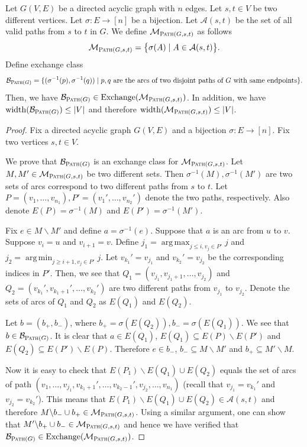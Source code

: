 \documentclass{article}
\newcommand{\M}{\mathcal M}
\newcommand{\B}{\mathcal B}
\newcommand{\del}{\backslash}
\DeclareMathOperator{\rank}{width}
\DeclareMathOperator*{\argmax}{arg\,max}
\DeclareMathOperator*{\argmin}{arg\,min}
\DeclareMathOperator{\Exchange}{Exchange}
\newcommand{\Path}{\textsc{Path}\xspace}
\begin{document}
\begin{fact}[Path]
\label{fact:path}
Let $G(V,E)$ be a directed acyclic graph with $n$ edges.
Let $s,t\in V$ be two different vertices.
Let $\sigma\colon E\rightarrow [n]$ be a bijection.
Let $\mathcal A(s,t)$ be the set of all valid paths from $s$ to $t$ in $G$. 
We define $\M_{\Path(G,s,t)}$ as follows
$$
\M_{\Path(G,s,t)} = \big\{\sigma(A) \mid A\in\mathcal A(s,t) \big\}.
$$
Define exchange class
$$
\B_{\Path(G)} = \{(\sigma^{-1}(p), \sigma^{-1}(q)) \mid p,q \text{ are the arcs of two disjoint paths of }G\text{ with same endpoints}\}.
$$
Then, we have $\B_{\Path(G)} \in \Exchange(\M_{\Path(G,s,t)})$. 
In addition, we have $\rank(\B_{\Path(G)}) \le |V|$ and therefore $\rank(\M_{\Path(G,s,t)}) \le |V|$.
\end{fact}

\begin{proof}
Fix  a directed acyclic graph $G(V,E)$ and a bijection $\sigma\colon E\rightarrow [n]$. 
Fix two vertices $s,t\in V$.

We prove that $\B_{\Path(G)}$ is an exchange class for $\M_{\Path(G,s,t)}$.
Let $M,M' \in \M_{\Path(G,s,t)}$ be two different sets. 
Then $\sigma^{-1}(M),\sigma^{-1}(M')$ are two sets of arcs correspond to two different paths from $s$ to $t$.
Let $P=(v_1,\ldots,v_{n_1}),P'=(v_1',\ldots,v_{n_2}')$ denote the two paths, respectively. 
Also denote $E(P) = \sigma^{-1}(M)$ and $E(P') = \sigma^{-1}(M')$.


Fix $e\in M\del M'$ and define $a=\sigma^{-1}(e)$.
Suppose that $a$ is an arc from $u$ to $v$.
Suppose $v_i=u$ and $v_{i+1} = v$.
Define $j_1 = \argmax_{j \le i, v_j\in P'} j$ and $j_2 = \argmin_{j \ge i+1, v_j \in P'} j$.
Let $v_{k_1}' = v_{j_1}$ and $v_{k_2}'= v_{j_2}$ be the corresponding indices in $P'$.
Then, we see that $Q_1=(v_{j_1},v_{j_1+1},\ldots,v_{j_2})$ and $Q_2= (v_{k_1}',v_{k_1+1}', \ldots,v_{k_2}')$ are two different paths from $v_{j_1}$ to $v_{j_2}$. 
Denote the sets of arcs of $Q_1$ and $Q_2$ as $E(Q_1)$ and $E(Q_2)$. 

Let $b=(b_+,b_-)$, where $b_+=\sigma(E(Q_2)), b_-=\sigma(E(Q_1))$. We see that $b \in \B_{\Path(G)}$.
It is clear that $a\in E(Q_1)$, $E(Q_1) \subseteq E(P) \del E(P')$ and $E(Q_2) \subseteq E(P') \del E(P)$. 
Therefore $e\in b_-$, $b_-\subseteq M\del M'$ and $b_+\subseteq M'\del M$.

Now it is easy to check that $E(P_1)\del E(Q_1) \cup E(Q_2)$ equals the set of arcs of path $(v_1,\ldots, v_{j_1}, v_{k_1+1}',\ldots, v_{k_2-1}', v_{j_2},\ldots, v_{n_1})$ (recall that $v_{j_1}=v_{k_1}'$ and $v_{j_2}=v_{k_2}'$).
This means that $E(P_1)\del E(Q_1)\cup E(Q_2) \in \mathcal A(s,t)$ and therefore $M\del b_-\cup b_+ \in \M_{\Path(G,s,t)}$.
Using a similar argument, one can show that $M'\del b_+\cup b_- \in \M_{\Path(G,s,t)}$ and hence we have verified that 
$\B_{\Path(G)}\in\Exchange(\M_{\Path(G,s,t)})$.
\end{proof}
\end{document}
